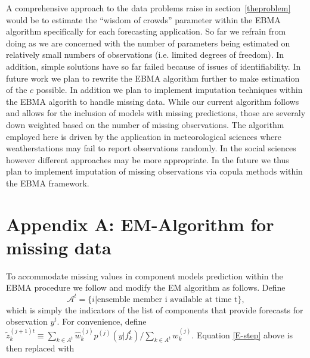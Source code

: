 \documentclass[12pt,fullpage,endnotes]{article}
\begin{document}
A comprehensive approach to the data problems raise in
section~\ref{theproblem} would be to estimate the ``wisdom of crowds''
parameter within the EBMA algorithm specifically for each forecasting
application. So far we refrain from doing as we are concerned with the
number of parameters being estimated on relatively small numbers of
observations (i.e. limited degrees of freedom). In addition, simple
solutions have so far failed because of issues of identifiability. In
future work we plan to rewrite the EBMA algorithm further to make
estimation of the $c$ possible.
In addition we plan to implement imputation techniques within the EBMA
algorith to handle missing data. While our current algorithm follows
\citet{Fraley:2010} and allows for the inclusion of models with
missing predictions, those are severaly down weighted based on the
number of missing observations. The algorithm employed here is driven
by the application in meteorological sciences where weatherstations
may fail to report observations randomly. In the social sciences
however different approaches may be more appropriate. In the future we
thus plan to implement imputation of missing observations via copula
methods within the EBMA framework.

\singlespacing




 \newpage
 \appendix

\doublespacing

 \section*{Appendix A: EM-Algorithm for missing data}

To accommodate missing values in component models prediction within
the EBMA procedure we follow \citet{Fraley:2010} and modify the EM
algorithm as follows.  Define $$\mathcal{A}^t = \{i|\mbox{ensemble
  member i available at time t}\},$$\noindent which is simply the
indicators of the list of components that provide forecasts for
observation $y^t$.  For convenience, define $\tilde{z}_k^{(j+1)t}
\equiv {{\underset{k \in
      A^t}{\sum}}\hat{w}^{(j)}_kp^{(j)}(y|f_{k}^{t})}/{\underset{k \in
    A^t}\sum w_k^{(j)}}$.  Equation \ref{E-step} above is then
replaced with
\end{document}
